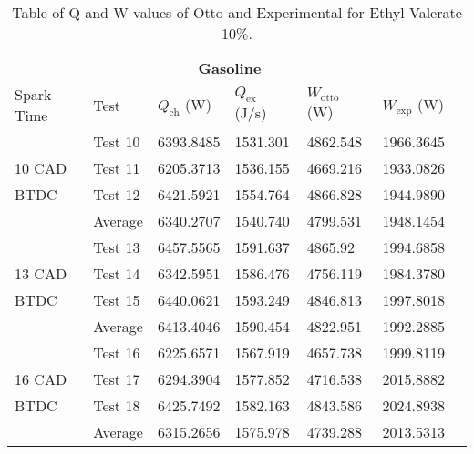 \begin{table}[H]
    \begin{center}
        \begin{tabular}{@{}l l l l l l l@{}}
            \toprule
            \multicolumn{6}{c}{\textbf{Gasoline}}                                                                             \\
            Spark Time & Test    & $Q_\textrm{ch}$ (W) & $Q_\textrm{ex}$ (J/s) & $W_\textrm{otto}$ (W) & $W_\textrm{exp}$ (W) \\
            \midrule
                       & Test 10 & 6393.8485           & 1531.301              & 4862.548              & 1966.3645            \\
            10 CAD     & Test 11 & 6205.3713           & 1536.155              & 4669.216              & 1933.0826            \\
            BTDC       & Test 12 & 6421.5921           & 1554.764              & 4866.828              & 1944.9890            \\
                       & Average & 6340.2707           & 1540.740              & 4799.531              & 1948.1454            \\
                       & Test 13 & 6457.5565           & 1591.637              & 4865.92               & 1994.6858            \\
            13 CAD     & Test 14 & 6342.5951           & 1586.476              & 4756.119              & 1984.3780            \\
            BTDC       & Test 15 & 6440.0621           & 1593.249              & 4846.813              & 1997.8018            \\
                       & Average & 6413.4046           & 1590.454              & 4822.951              & 1992.2885            \\
                       & Test 16 & 6225.6571           & 1567.919              & 4657.738              & 1999.8119            \\
            16 CAD     & Test 17 & 6294.3904           & 1577.852              & 4716.538              & 2015.8882            \\
            BTDC       & Test 18 & 6425.7492           & 1582.163              & 4843.586              & 2024.8938            \\
                       & Average & 6315.2656           & 1575.978              & 4739.288              & 2013.5313            \\
            \bottomrule
        \end{tabular}
        \caption{Table of Q and W values of Otto and Experimental for Ethyl-Valerate 10\%.}
        \label{q4-t5}
    \end{center}
\end{table}
